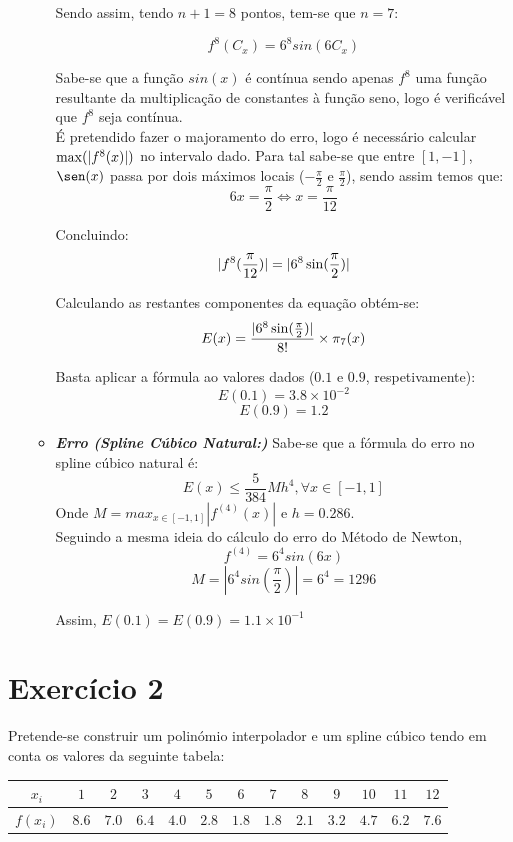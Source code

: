 \documentclass[12pt, letterpaper,fleqn]{article}
\DeclarePairedDelimiter\abs{\lvert}{\rvert}%
\begin{document}
\begin{itemize}
\begin{itemize}
            Sendo assim, tendo $n+1 = 8$ pontos, tem-se que $n = 7$:

            $$f^8(C_x) = 6^8sin(6C_x)$$

            Sabe-se que a função $sin(x)$ é contínua sendo apenas $f^8$ uma função resultante da multiplicação de constantes à função seno, logo é verificável que $f^8$ seja contínua. \\

            É pretendido fazer o majoramento do erro, logo é necessário calcular $\max(\abs{f^8(x)})$ no intervalo dado. Para tal sabe-se que entre $[1,-1]$, $\sen(x)$ passa por dois máximos locais ($-\frac{\pi}{2}$ e $\frac{\pi}{2}$), sendo assim temos que:
            $$6x = \frac{\pi}{2} \Leftrightarrow x = \frac{\pi}{12}$$

            Concluindo:
            $$\abs{f^8(\frac{\pi}{12})} = \abs{6^8\sin(\frac{\pi}{2})}$$

            Calculando as restantes componentes da equação obtém-se:
            $$E(x) = \frac{\abs{6^8\sin(\frac{\pi}{2})}}{8!}\times \pi_7(x)$$

            Basta aplicar a fórmula ao valores dados ($0.1$ e $0.9$, respetivamente):
            $$E(0.1) = 3.8\times 10^{-2}$$
            $$E(0.9) = 1.2$$
        \item \textbf{\textit{Erro (Spline Cúbico Natural:)}}
            Sabe-se que a fórmula do erro no spline cúbico natural é:
            $$E(x) \leq \frac{5}{384}Mh^4, \forall x \in [-1,1]$$
            Onde $M = max_{x\in[-1,1]}|f^{(4)}(x)|$ e $h = 0.286$. \\
            Seguindo a mesma ideia do cálculo do erro do Método de Newton, 
            $$f^{(4)} = 6^4sin(6x)$$
            $$M = |6^4sin(\frac{\pi}{2})| = 6^4 = 1296$$
            
            Assim, $E(0.1) = E(0.9) = 1.1\times10^{-1}$
    \end{itemize}
\end{itemize}

\section*{Exercício 2}

Pretende-se construir um polinómio interpolador e um spline cúbico tendo em conta os valores da seguinte tabela:

\begin{center}
    \begin{tabular} {|| c | c | c | c | c | c | c | c | c | c | c | c | c ||} \hline
        $x_i$ & $1$ & $2$ & $3$ & $4$ & $5$ & $6$ & $7$ & $8$ & $9$ & $10$ & $11$ & $12$\\ [0.4ex]\hline
        $f(x_i)$ & $8.6$ & $7.0$ & $6.4$ & $4.0$ & $2.8$ & $1.8$ & $1.8$ & $2.1$ & $3.2$ & $4.7$ & $6.2$ & $7.6$ \\ [0.4ex]\hline
    \end{tabular}
\end{center}
\end{document}
